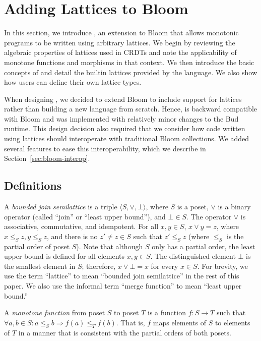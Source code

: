 \section{Adding Lattices to Bloom}
\label{sec:lang}

In this section, we introduce \lang, an extension to Bloom that allows monotonic
programs to be written using arbitrary lattices. We begin by reviewing the
algebraic properties of lattices used in CRDTs and note the applicability of
monotone functions and morphisms in that context. We then introduce the basic
concepts of \lang and detail the builtin lattices provided by the language. We
also show how users can define their own lattice types.

When designing \lang, we decided to extend Bloom to include support for lattices
rather than building a new language from scratch. Hence, \lang is backward
compatible with Bloom and was implemented with relatively minor changes to the
Bud runtime. This design decision also required that we consider how code
written using lattices should interoperate with traditional Bloom collections. We
added several \lang features to ease this interoperability, which we describe in
Section~\ref{sec:bloom-interop}.

\subsection{Definitions}
\label{sec:lattice-defn}
A \emph{bounded join semilattice} is a triple $\langle S, \lor, \bot\rangle$,
where $S$ is a poset, $\lor$ is a binary operator (called ``join'' or ``least
upper bound''), and $\bot \in S$. The operator $\lor$ is associative,
commutative, and idempotent. For all $x, y \in S$, $x \lor y = z$, where $x
\leq_S z, y \leq_S z$, and there is no $z' \ne z \in S$ such that $z' \leq_S z$
(where $\leq_S$ is the partial order of poset $S$). Note that although $S$ only
has a partial order, the least upper bound is defined for all elements $x,y \in
S$. The distinguished element $\bot$ is the smallest element in $S$; therefore,
$x \lor \bot = x$ for every $x \in S$. For brevity, we use the term ``lattice''
to mean ``bounded join semilattice'' in the rest of this paper. We also use the
informal term ``merge function'' to mean ``least upper bound.''

A \emph{monotone function} from poset $S$ to poset $T$ is a function $f: S \to
T$ such that $\forall a,b \in S: a \leq_S b \Rightarrow f(a) \leq_T f(b)$. That
is, $f$ maps elements of $S$ to elements of $T$ in a manner that is consistent
with the partial orders of both posets.

